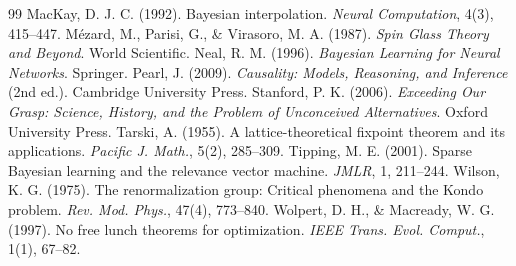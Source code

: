 \documentclass[11pt]{article}
\theoremstyle{definition}
\theoremstyle{plain}
\begin{document}
\begin{thebibliography}{99}
 MacKay, D. J. C. (1992). Bayesian interpolation. \emph{Neural Computation}, 4(3), 415--447.
 M\'ezard, M., Parisi, G., \& Virasoro, M. A. (1987). \emph{Spin Glass Theory and Beyond}. World Scientific.
 Neal, R. M. (1996). \emph{Bayesian Learning for Neural Networks}. Springer.
 Pearl, J. (2009). \emph{Causality: Models, Reasoning, and Inference} (2nd ed.). Cambridge University Press.
 Stanford, P. K. (2006). \emph{Exceeding Our Grasp: Science, History, and the Problem of Unconceived Alternatives}. Oxford University Press.
 Tarski, A. (1955). A lattice-theoretical fixpoint theorem and its applications. \emph{Pacific J. Math.}, 5(2), 285--309.
 Tipping, M. E. (2001). Sparse Bayesian learning and the relevance vector machine. \emph{JMLR}, 1, 211--244.
 Wilson, K. G. (1975). The renormalization group: Critical phenomena and the Kondo problem. \emph{Rev. Mod. Phys.}, 47(4), 773--840.
 Wolpert, D. H., \& Macready, W. G. (1997). No free lunch theorems for optimization. \emph{IEEE Trans. Evol. Comput.}, 1(1), 67--82.
\end{thebibliography}
\end{document}
